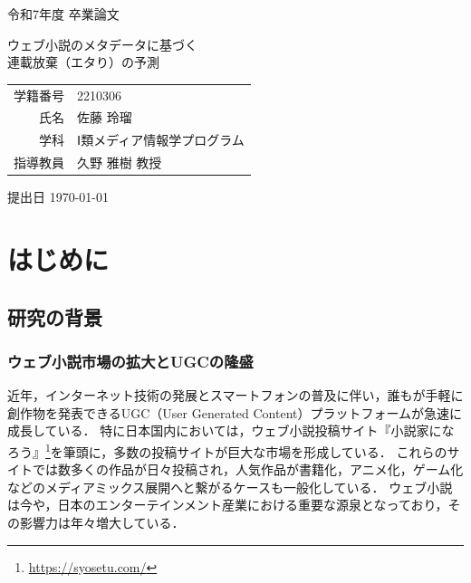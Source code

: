 \documentclass[uplatex, dvipdfmx, 11pt, a4paper, report]{jsbook}
\begin{document}

\begin{titlepage}
  \centering
  \vspace*{30mm} 
  
  {\huge 令和7年度 卒業論文 \par}
  
  \vspace{20mm}
  
  {\Huge ウェブ小説のメタデータに基づく\\連載放棄（エタり）の予測 \par}
  
  \vfill
  
  \begin{tabular}{rl}
      \Large 学籍番号 & \Large 2210306 \\[15pt]
      \Large 氏名     & \Large 佐藤 玲瑠 \\[15pt]
      \Large 学科     & \Large Ⅰ類メディア情報学プログラム \\[15pt]
      \Large 指導教員 & \Large 久野 雅樹 教授
  \end{tabular}
  
  \vspace{40mm} 
  
  {\Large 提出日 \today}
  
  \vspace{20mm}
\end{titlepage}

\newpage
\thispagestyle{empty}
\mbox{}
\newpage

\setcounter{page}{1}
\tableofcontents



\chapter{はじめに}

\section{研究の背景}

\subsection{ウェブ小説市場の拡大とUGCの隆盛}
近年，インターネット技術の発展とスマートフォンの普及に伴い，誰もが手軽に創作物を発表できるUGC（User Generated Content）プラットフォームが急速に成長している．
特に日本国内においては，ウェブ小説投稿サイト『小説家になろう』\footnote{\url{https://syosetu.com/}}を筆頭に，多数の投稿サイトが巨大な市場を形成している．
これらのサイトでは数多くの作品が日々投稿され，人気作品が書籍化，アニメ化，ゲーム化などのメディアミックス展開へと繋がるケースも一般化している．
ウェブ小説は今や，日本のエンターテインメント産業における重要な源泉となっており，その影響力は年々増大している．
\end{document}
